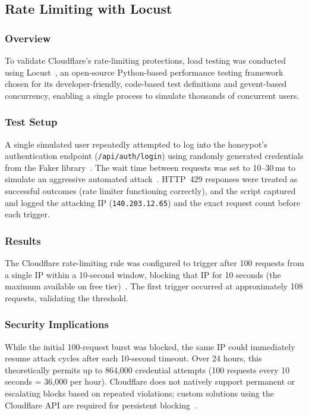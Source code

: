 \documentclass[12pt, a4paper]{report}   %
\begin{document}
\subsection{Rate Limiting with Locust}
\label{sec:cf-rate-limiting}

\subsubsection{Overview}

To validate Cloudflare's rate-limiting protections, load testing was conducted using
Locust~\cite{locust}, an open-source Python-based performance testing framework chosen
for its developer-friendly, code-based test definitions and gevent-based concurrency,
enabling a single process to simulate thousands of concurrent users.

\subsubsection{Test Setup}

A single simulated user repeatedly attempted to log into the honeypot's authentication
endpoint (\texttt{/api/auth/login}) using randomly generated credentials from the
Faker library~\cite{faker}. The wait time between requests was set to 10--30\,ms to
simulate an aggressive automated attack~\cite{fortinet-brute-force}. HTTP~429 
responses were treated as successful outcomes (rate limiter functioning correctly), 
and the script captured and logged the attacking IP (\texttt{140.203.12.65}) and the 
exact request count before each trigger.

\subsubsection{Results}

The Cloudflare rate-limiting rule was configured to trigger after 100 requests from a
single IP within a 10-second window, blocking that IP for 10 seconds (the maximum
available on free tier)~\cite{cf-rate-limiting}. The first trigger occurred at 
approximately 108 requests, validating the threshold.

\subsubsection{Security Implications}
\label{sec:cf-rate-implications}

While the initial 100-request burst was blocked, the same IP could immediately
resume attack cycles after each 10-second timeout. Over 24 hours, this theoretically
permits up to 864,000 credential attempts (100 requests every 10 seconds = 36,000 per
hour). Cloudflare does not natively support permanent or escalating blocks based on
repeated violations; custom solutions using the Cloudflare API are required for
persistent blocking~\cite{cf-community-blocking}.
\end{document}

